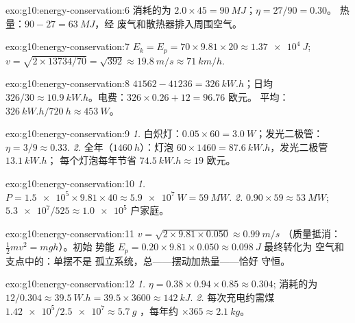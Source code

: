 \begin{solution}{exo:g10:energy-conservation:6}
消耗的为 $2.0 \times 45 = \qty{90}{MJ}$；$\eta = 27/90 = 0.30$。
热量：$90 - 27 = \qty{63}{MJ}$，经
废气和散热器排入周围空气。
\end{solution}

\begin{solution}{exo:g10:energy-conservation:7}
$E_k = E_p = 70 \times 9.81 \times 20 \approx \qty{1.37e4}{J}$;
$v = \sqrt{2 \times 13734/70} = \sqrt{392} \approx \qty{19.8}{m/s}
\approx \qty{71}{km/h}$.
\end{solution}

\begin{solution}{exo:g10:energy-conservation:8}
$41562 - 41236 = \qty{326}{kW.h}$；日均 $326/30 \approx
\qty{10.9}{kW.h}$。电费：$326 \times 0.26 + 12 = 96.76$ 欧元。
平均：$\qty{326}{kW.h}/\qty{720}{h} \approx \qty{453}{W}$。
\end{solution}

\begin{solution}{exo:g10:energy-conservation:9}
\emph{1.} 白炽灯：$0.05 \times 60 = \qty{3.0}{W}$；发光二极管：
$\eta = 3/9 \approx 0.33$.
\emph{2.} 全年（$\qty{1460}{h}$）：灯泡 
$60 \times 1460 = \qty{87.6}{kW.h}$，发光二极管 $\qty{13.1}{kW.h}$；
每个灯泡每年节省 $\qty{74.5}{kW.h} \approx 19$ 欧元。
\end{solution}

\begin{solution}{exo:g10:energy-conservation:10}
\emph{1.} $P = \num{1.5e5} \times 9.81 \times 40 \approx
\qty{5.9e7}{W} = \qty{59}{MW}$.
\emph{2.} $0.90 \times 59 \approx \qty{53}{MW}$;
$\num{5.3e7}/525 \approx \num{1.0e5}$ 户家庭。
\end{solution}

\begin{solution}{exo:g10:energy-conservation:11}
$v = \sqrt{2 \times 9.81 \times 0.050} \approx \qty{0.99}{m/s}$
（质量抵消：$\tfrac12 m v^2 = mgh$）。初始
势能 $E_p = 0.20 \times 9.81 \times 0.050 \approx \qty{0.098}{J}$ 最终转化为
空气和支点中的：单摆不是
孤立系统，总——摆动加热量——恰好
守恒。
\end{solution}

\begin{solution}{exo:g10:energy-conservation:12}
\emph{1.} $\eta = 0.38 \times 0.94 \times 0.85 \approx 0.304$;
消耗的为 $12/0.304 \approx \qty{39.5}{W.h}
= 39.5 \times 3600 \approx \qty{142}{kJ}$.
\emph{2.} 每次充电约需煤 $\num{1.42e5}/\num{2.5e7} \approx \qty{5.7}{g}$
，每年约 $\times 365 \approx \qty{2.1}{kg}$。
\end{solution}

